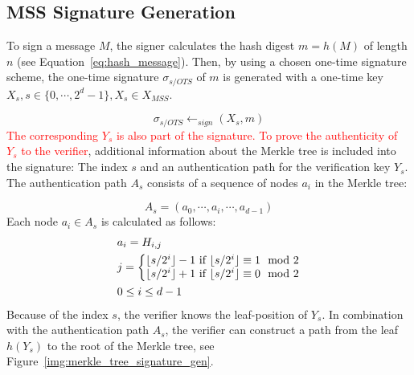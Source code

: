\subsection{MSS Signature Generation}
To sign a message $M$, the signer calculates the hash digest $m = h(M)$ of length $n$ (see Equation~\ref{eq:hash_message}). Then, by using a chosen one-time signature scheme, the one-time signature $\sigma_{s/OTS}$ of $m$ is generated with a one-time key $X_s, s \in \{0, \cdots, 2^d - 1\}, X_s \in X_{MSS}$. 

\begin{equation}
\label{eq:merkle_s/OTS_signature}
\sigma_{s/OTS} \leftarrow_{sign} (X_s, m) 
\end{equation}
\textcolor{red}{The corresponding $Y_s$ is also part of the signature.%
To prove the authenticity of $Y_s$ to the verifier}, additional information about the Merkle tree is included into the signature: The index $s$ and an authentication path for the verification key $Y_s$. The authentication path $A_s$ consists of a sequence of nodes $a_i$ in the Merkle tree:

\begin{equation}
A_s = (a_0,\cdots, a_i, \cdots, a_{d-1})
\end{equation}
Each node $a_i \in A_s$ is calculated as follows:
\begin{align}
\label{eq:auth_path_calculation_merkle_tree}
&a_{i} = H_{i, j} \\
&j = 
\left\{\begin{matrix} \nonumber
\lfloor s/2^i\rfloor-1 \text{ if } \lfloor s/2^i\rfloor \equiv 1 \mod{2} \\
\lfloor s/2^i\rfloor+1 \text{ if } \lfloor s/2^i\rfloor \equiv 0 \mod{2}
\end{matrix}\right.  \nonumber \\
&0 \leq i \leq d-1 \nonumber
\end{align}
Because of the index $s$, the verifier knows the leaf-position of $Y_s$. In combination with the authentication path $A_s$, the verifier can construct a path from the leaf $h(Y_s)$ to the root of the Merkle tree, see Figure~\ref{img:merkle_tree_signature_gen}. %


